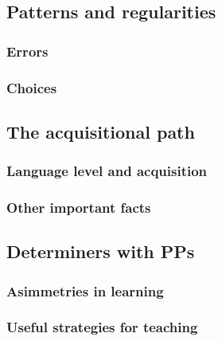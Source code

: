 \documentclass[
  a4paper,
  twoside,
  12pt,
  chapterprefix=false,
  bibliography=totocnumbered,
  listof=flat]{scrbook}
\begin{document}
\hypertarget{patterns-and-regularities}{%
\subsection{Patterns and regularities}\label{patterns-and-regularities}}

\hypertarget{errors}{%
\subsubsection{Errors}\label{errors}}

\hypertarget{choices}{%
\subsubsection{Choices}\label{choices}}

\hypertarget{the-acquisitional-path}{%
\subsection{The acquisitional path}\label{the-acquisitional-path}}

\hypertarget{language-level-and-acquisition}{%
\subsubsection{Language level and acquisition}\label{language-level-and-acquisition}}

\hypertarget{other-important-facts}{%
\subsubsection{Other important facts}\label{other-important-facts}}

\hypertarget{determiners-with-pps}{%
\subsection{Determiners with PPs}\label{determiners-with-pps}}

\hypertarget{asimmetries-in-learning}{%
\subsubsection{Asimmetries in learning}\label{asimmetries-in-learning}}

\hypertarget{useful-strategies-for-teaching}{%
\subsubsection{Useful strategies for teaching}\label{useful-strategies-for-teaching}}
\end{document}
